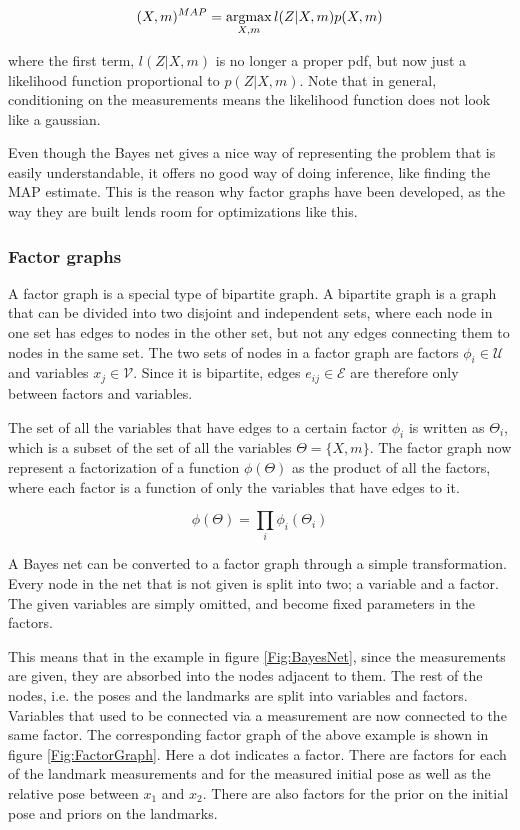 \begin{equation}
    (X,m)^{MAP} = \operatorname*{argmax}_{X,m}l(Z|X,m)p(X,m)
\end{equation}

where the first term, $l(Z|X,m)$ is no longer a proper pdf, but now just a likelihood function proportional to $p(Z|X,m)$. Note that in general, conditioning on the measurements means the likelihood function does not look like a gaussian.

Even though the Bayes net gives a nice way of representing the problem that is easily understandable, it offers no good way of doing inference, like finding the MAP estimate. This is the reason why factor graphs have been developed, as the way they are built lends room for optimizations like this.

\subsubsection{Factor graphs}

A factor graph is a special type of bipartite graph. A bipartite graph is a graph that can be divided into two disjoint and independent sets, where each node in one set has edges to nodes in the other set, but not any edges connecting them to nodes in the same set. The two sets of nodes in a factor graph are factors $\phi_i\in \mathcal{U}$ and variables $x_j\in \mathcal{V}$. Since it is bipartite, edges $e_{ij}\in \mathcal{E}$ are therefore only between factors and variables. 

The set of all the variables that have edges to a certain factor $\phi_i$ is written as $\Theta_i$, which is a subset of the set of all the variables $\Theta = \{X,m\}$. The factor graph now represent a factorization of a function $\phi(\Theta)$ as the product of all the factors, where each factor is a function of only the variables that have edges to it.

\begin{equation}
    \phi(\Theta) = \prod_i \phi_i(\Theta_i)
\end{equation}

A Bayes net can be converted to a factor graph through a simple transformation. Every node in the net that is not given is split into two; a variable and a factor. The given variables are simply omitted, and become fixed parameters in the factors. 

This means that in the example in figure \ref{Fig:BayesNet}, since the measurements are given, they are absorbed into the nodes adjacent to them. The rest of the nodes, i.e. the poses and the landmarks are split into variables and factors. Variables that used to be connected via a measurement are now connected to the same factor. The corresponding factor graph of the above example is shown in figure \ref{Fig:FactorGraph}. Here a dot indicates a factor. There are factors for each of the landmark measurements and for the measured initial pose as well as the relative pose between $x_1$ and $x_2$. There are also factors for the prior on the initial pose and priors on the landmarks.

